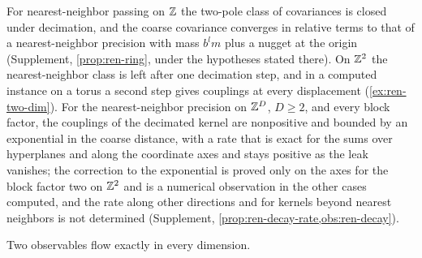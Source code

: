For nearest-neighbor passing on $\mathbb{Z}$ the two-pole class of covariances is closed under decimation, and the coarse covariance converges in relative terms to that of a nearest-neighbor precision with mass $b^lm$ plus a nugget at the origin (Supplement, \cref{prop:ren-ring}, under the hypotheses stated there). On $\mathbb{Z}^2$ the nearest-neighbor class is left after one decimation step, and in a computed instance on a torus a second step gives couplings at every displacement (\cref{ex:ren-two-dim}). For the nearest-neighbor precision on $\mathbb{Z}^D$, $D\ge2$, and every block factor, the couplings of the decimated kernel are nonpositive and bounded by an exponential in the coarse distance, with a rate that is exact for the sums over hyperplanes and along the coordinate axes and stays positive as the leak vanishes; the correction to the exponential is proved only on the axes for the block factor two on $\mathbb{Z}^2$ and is a numerical observation in the other cases computed, and the rate along other directions and for kernels beyond nearest neighbors is not determined (Supplement, \cref{prop:ren-decay-rate,obs:ren-decay}).

Two observables flow exactly in every dimension.

